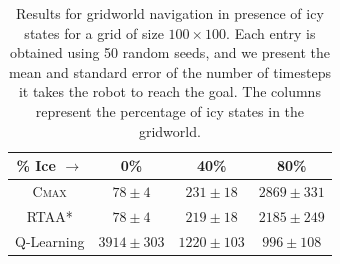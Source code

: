 \begin{table}[t]
  \centering
  \begin{tabular}{|c|c|c|c|}
    \hline
    \textbf{\% Ice} $\rightarrow$& \textbf{0\%} & \textbf{40\%}
    & \textbf{80\%} \\
    \hline
    \textsc{Cmax} & $78 \pm 4 $ & $231
                                                                \pm
                                                                18
                                                                $
    & $2869 \pm 331 $ \\
    \hline
    RTAA* & $78 \pm 4 $  &
                                                                  $219
                                                                  \pm
                                                                  18
                                                                  $
    & $2185 \pm 249 $ \\
    \hline
    Q-Learning & $3914 \pm 303 $ &
                                                               $1220
                                                               \pm
                                                               103
                                                               $
    & $996 \pm 108 $ \\
    \hline
  \end{tabular}
  \caption{Results for gridworld navigation in presence of
    icy states for a grid of size $100 \times 100$. Each entry is obtained using 50 random seeds, and we
    present the mean and standard error of the number of timesteps it
    takes the robot to reach the goal. The columns represent the
    percentage of icy states in the gridworld.
}
\label{tab:icy}
\end{table}

